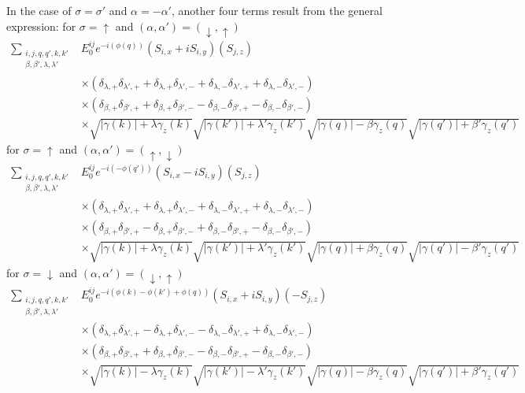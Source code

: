 In the case of $\sigma = \sigma'$ and $ \alpha = - \alpha'$, another four terms result from the general expression: \newline
for $\sigma = \uparrow$ and $(\alpha, \alpha') =(\downarrow, \uparrow)$
\begin{align} 
    \sum_{\substack{i, j, q,q', k, k'\\ \beta, \beta', \lambda, \lambda'}} &E^{ij}_0 e^{-i(\phi(q))} \left(S_{i,x}+iS_{i,y} \right) \left( S_{j,z} \right)\\ \nonumber
   &\times \left( \delta_{\lambda,+}\delta_{\lambda',+} +  \delta_{\lambda,+}\delta_{\lambda',-}+ \delta_{\lambda,-}\delta_{\lambda',+} +\delta_{\lambda,-}\delta_{\lambda',-}\right)\\\nonumber
   &\times \left( \delta_{\beta,+}\delta_{\beta',+} + \delta_{\beta,+}\delta_{\beta',-} -\delta_{\beta,-}\delta_{\beta',+} -\delta_{\beta,-}\delta_{\beta',-}\right)\\\nonumber
   &\times \sqrt{|\gamma(k)|+ \lambda \gamma_z(k)}\sqrt{|\gamma(k')|+ \lambda'\gamma_z(k')}\sqrt{|\gamma(q)|-\beta\gamma_z(q)}\sqrt{|\gamma(q')|+ \beta'\gamma_z(q')}
\end{align}
for $\sigma = \uparrow$ and $(\alpha, \alpha') =(\uparrow, \downarrow)$
\begin{align} 
    \sum_{\substack{i, j, q,q', k, k'\\ \beta, \beta', \lambda, \lambda'}} &E^{ij}_0 e^{-i(-\phi(q'))} \left(S_{i,x}-iS_{i,y} \right) \left( S_{j,z} \right)\\ \nonumber
   &\times \left( \delta_{\lambda,+}\delta_{\lambda',+} +\delta_{\lambda,+}\delta_{\lambda',-}+\delta_{\lambda,-}\delta_{\lambda',+}+\delta_{\lambda,-}\delta_{\lambda',-}\right)\\\nonumber
   &\times \left( \delta_{\beta,+}\delta_{\beta',+} -\delta_{\beta,+}\delta_{\beta',-}+ \delta_{\beta,-}\delta_{\beta',+} -\delta_{\beta,-}\delta_{\beta',-}\right)\\\nonumber
   &\times \sqrt{|\gamma(k)|+ \lambda\gamma_z(k)}\sqrt{|\gamma(k')|+ \lambda'\gamma_z(k')}\sqrt{|\gamma(q)|+\beta\gamma_z(q)}\sqrt{|\gamma(q')|- \beta'\gamma_z(q')}
\end{align}
for $\sigma = \downarrow$ and $(\alpha, \alpha') =(\downarrow, \uparrow)$
\begin{align} 
    \sum_{\substack{i, j, q,q', k, k'\\ \beta, \beta', \lambda, \lambda'}} &E^{ij}_0 e^{-i(\phi(k)-\phi(k')+\phi(q))} \left(S_{i,x}+iS_{i,y} \right) \left( -S_{j,z} \right)\\ \nonumber
   &\times \left( \delta_{\lambda,+}\delta_{\lambda',+} -\delta_{\lambda,+}\delta_{\lambda',-} -\delta_{\lambda,-}\delta_{\lambda',+} +\delta_{\lambda,-}\delta_{\lambda',-}\right)\\\nonumber
   &\times \left( \delta_{\beta,+}\delta_{\beta',+} + \delta_{\beta,+}\delta_{\beta',-} -\delta_{\beta,-}\delta_{\beta',+} -\delta_{\beta,-}\delta_{\beta',-}\right)\\\nonumber
   &\times \sqrt{|\gamma(k)|- \lambda \gamma_z(k)}\sqrt{|\gamma(k')|- \lambda'\gamma_z(k')}\sqrt{|\gamma(q)|-\beta \gamma_z(q)}\sqrt{|\gamma(q')|+ \beta'\gamma_z(q')}
\end{align}
